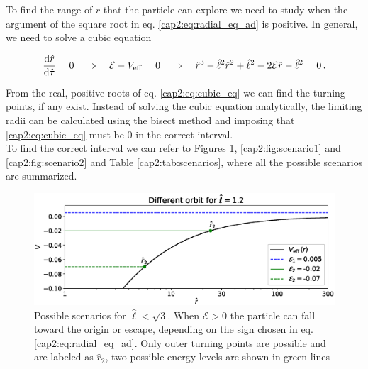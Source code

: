 To find the range of $r$ that the particle can explore we need to study when the
argument of the square root in eq. \ref{cap2:eq:radial_eq_ad} is positive.
In general, we need to solve a cubic equation

\begin{equation}
    \dv{\hat r}{\hat \tau} = 0
    \quad \Rightarrow \quad
    \mathcal E - V_{\rm eff} = 0
    \quad \Rightarrow \quad
    \hat r^3 - \hat \ell^2 \hat r^2 + \hat \ell^2 - 2 \mathcal E
    \hat r - \hat \ell^2 = 0 \, .
    \label{cap2:eq:cubic_eq}
\end{equation}

From the real, positive roots of eq. \ref{cap2:eq:cubic_eq} we can find the
turning points, if any exist.
Instead of solving the cubic equation analytically, the limiting radii can be
calculated using the bisect method and imposing that \ref{cap2:eq:cubic_eq}
must be 0 in the correct interval. \\
To find the correct interval we can refer to Figures \ref{cap2:fig:scenario0},
\ref{cap2:fig:scenario1} and \ref{cap2:fig:scenario2} and Table
\ref{cap2:tab:scenarios}, where all the possible scenarios are summarized.

\begin{figure}[h!]
    \centering
    \includegraphics[width= 0.66 \textwidth]{Figures/chapter2/scenario0.eps}
    \caption{Possible scenarios for $\hat \ell < \sqrt{3}$.
    When $\mathcal E > 0$ the particle can fall toward the origin or escape,
    depending on the sign chosen in eq. \ref{cap2:eq:radial_eq_ad}.
    Only outer turning points are possible and are labeled as $\hat r_2$, two
    possible energy levels are shown in green lines
    }
    \label{cap2:fig:scenario0}
\end{figure}

